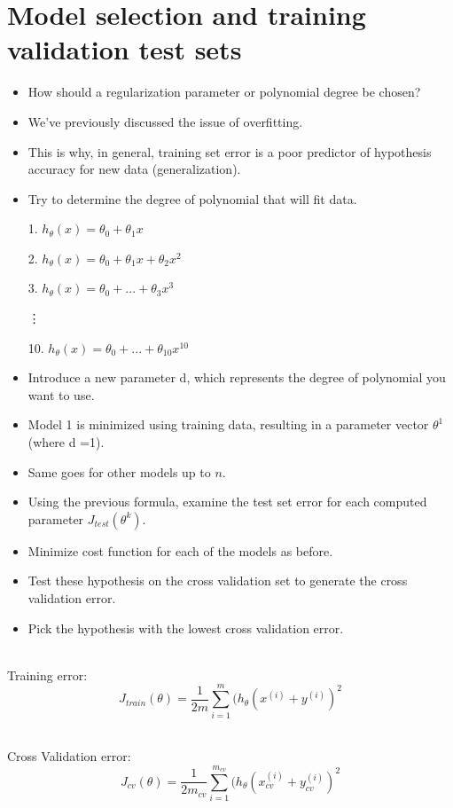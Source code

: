 \documentclass{article}
\begin{document}
\section*{Model selection and training validation test sets}

\begin{itemize}
  \item How should a regularization parameter or polynomial degree be chosen?
  \item We've previously discussed the issue of overfitting.
  \item This is why, in general, training set error is a poor predictor of hypothesis accuracy for new data (generalization).
  \item Try to determine the degree of polynomial that will fit data.

        1. $h_{\theta}(x) = \theta_0 + \theta_1x$

        2. $h_{\theta}(x) = \theta_0 + \theta_1x + \theta_2x^2$

        3. $h_{\theta}(x) = \theta_0 + ... + \theta_3x^3$

        \quad \vdots

        10. $h_{\theta}(x) = \theta_0 + ... + \theta_{10}x^{10}$

  \item Introduce a new parameter d, which represents the degree of polynomial you want to use.
  \item Model 1 is minimized using training data, resulting in a parameter vector $\theta^1$ (where d =1).
  \item Same goes for other models up to $n$.
  \item Using the previous formula, examine the test set error for each computed parameter $J_{test}(\theta^k)$.
  \item Minimize cost function for each of the models as before.
  \item Test these hypothesis on the cross validation set to generate the cross validation error.
  \item Pick the hypothesis with the lowest cross validation error.
\end{itemize}

~\\
Training error:
$$J_{train}(\theta) = \frac{1}{2m}  \sum_{i=1}^{m}(h_{\theta}(x^{(i)} + y^{(i)})^2$$

~\\
Cross Validation error:
$$J_{cv}(\theta) = \frac{1}{2m_{cv}}  \sum_{i=1}^{m_{cv}}(h_{\theta}(x^{(i)}_{cv} + y^{(i)}_{cv})^2$$
\end{document}
